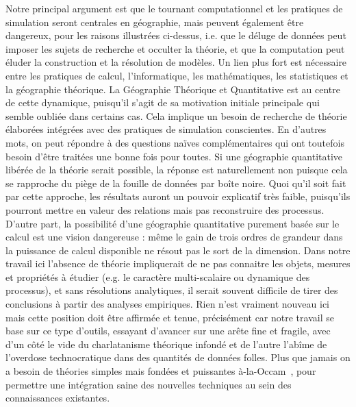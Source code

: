 {Notre principal argument est que le tournant computationnel et les pratiques de simulation seront centrales en géographie, mais peuvent également être dangereux, pour les raisons illustrées ci-dessus, i.e. que le déluge de données peut imposer les sujets de recherche et occulter la théorie, et que la computation peut éluder la construction et la résolution de modèles. Un lien plus fort est nécessaire entre les pratiques de calcul, l'informatique, les mathématiques, les statistiques et la géographie théorique. La Géographie Théorique et Quantitative est au centre de cette dynamique, puisqu'il s'agit de sa motivation initiale principale qui semble oubliée dans certains cas. Cela implique un besoin de recherche de théorie élaborées intégrées avec des pratiques de simulation conscientes. En d'autres mots, on peut répondre à des questions naïves complémentaires qui ont toutefois besoin d'être traitées une bonne fois pour toutes. Si une géographie quantitative libérée de la théorie serait possible, la réponse est naturellement non puisque cela se rapproche du piège de la fouille de données par boîte noire. Quoi qu'il soit fait par cette approche, les résultats auront un pouvoir explicatif très faible, puisqu'ils pourront mettre en valeur des relations mais pas reconstruire des processus. D'autre part, la possibilité d'une géographie quantitative purement basée sur le calcul est une vision dangereuse : même le gain de trois ordres de grandeur dans la puissance de calcul disponible ne résout pas le sort de la dimension. Dans notre travail ici l'absence de théorie impliquerait de ne pas connaitre les objets, mesures et propriétés à étudier (e.g. le caractère multi-scalaire ou dynamique des processus), et sans résolutions analytiques, il serait souvent difficile de tirer des conclusions à partir des analyses empiriques. Rien n'est vraiment nouveau ici mais cette position doit être affirmée et tenue, précisément car notre travail se base sur ce type d'outils, essayant d'avancer sur une arête fine et fragile, avec d'un côté le vide du charlatanisme théorique infondé et de l'autre l'abîme de l'overdose technocratique dans des quantités de données folles. Plus que jamais on a besoin de théories simples mais fondées et puissantes {\`a}-la-Occam~\cite{batty2016theoretical}, pour permettre une intégration saine des nouvelles techniques au sein des connaissances existantes.
}


 


